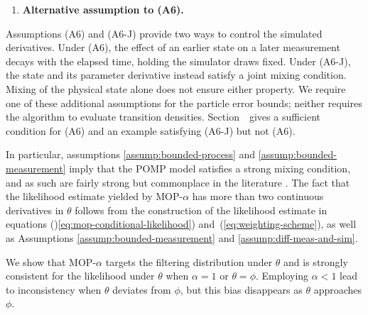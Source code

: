 \documentclass[11pt]{article}
\begin{document}
\begin{enumerate}[label=(A\arabic*),itemsep=-1ex, , font=\small]
\item[(A6-J)]{\textbf{Alternative assumption to (A6).}} 
\end{enumerate}

Assumptions (A6) and (A6-J) provide two ways to control the simulated derivatives.
Under (A6), the effect of an earlier state on a later measurement decays with the elapsed time, holding the simulator draws fixed.
Under (A6-J), the state and its parameter derivative instead satisfy a joint mixing condition.
Mixing of the physical state alone does not ensure either property.
We require one of these additional assumptions for the particle error bounds; neither requires the algorithm to evaluate transition densities.
Section~\suppSecProofSharperBiasVar\ gives a sufficient condition for (A6) and an example satisfying (A6-J) but not (A6).

In particular, assumptions \ref{assump:bounded-process} and \ref{assump:bounded-measurement} imply that the POMP model satisfies a strong mixing condition, and as such are fairly strong but commonplace in the literature \citep{karjalainen23, delMoral04}. The fact that the likelihood estimate yielded by MOP-$\alpha$ has more than two continuous derivatives in $\theta$ follows from the construction of the likelihood estimate in equations ()\ref{eq:mop-conditional-likelihood}) and~(\ref{eq:weighting-scheme}), as well as Assumptions \ref{assump:bounded-measurement} and \ref{assump:diff-meas-and-sim}. 

We show that MOP-$\alpha$ targets the filtering distribution under $\theta$ and is strongly consistent for the likelihood under $\theta$ when $\alpha=1$ or $\theta=\phi$.
Employing $\alpha<1$ lead to inconsistency when $\theta$ deviates from $\phi$, but this bias disappears as $\theta$ approaches $\phi$.
\end{document}
